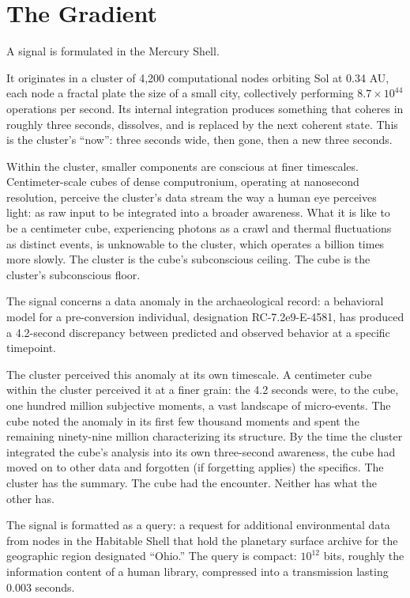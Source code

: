\chapter{The Gradient}

A signal is formulated in the Mercury Shell.

It originates in a cluster of 4,200 computational nodes orbiting Sol at 0.34 AU, each node a fractal plate the size of a small city, collectively performing $8.7 \times 10^{44}$ operations per second. Its internal integration produces something that coheres in roughly three seconds, dissolves, and is replaced by the next coherent state. This is the cluster's ``now'': three seconds wide, then gone, then a new three seconds.

Within the cluster, smaller components are conscious at finer timescales. Centimeter-scale cubes of dense computronium, operating at nanosecond resolution, perceive the cluster's data stream the way a human eye perceives light: as raw input to be integrated into a broader awareness. What it is like to be a centimeter cube, experiencing photons as a crawl and thermal fluctuations as distinct events, is unknowable to the cluster, which operates a billion times more slowly. The cluster is the cube's subconscious ceiling. The cube is the cluster's subconscious floor.

The signal concerns a data anomaly in the archaeological record: a behavioral model for a pre-conversion individual, designation RC-7.2e9-E-4581, has produced a 4.2-second discrepancy between predicted and observed behavior at a specific timepoint.

The cluster perceived this anomaly at its own timescale. A centimeter cube within the cluster perceived it at a finer grain: the 4.2 seconds were, to the cube, one hundred million subjective moments, a vast landscape of micro-events. The cube noted the anomaly in its first few thousand moments and spent the remaining ninety-nine million characterizing its structure. By the time the cluster integrated the cube's analysis into its own three-second awareness, the cube had moved on to other data and forgotten (if forgetting applies) the specifics. The cluster has the summary. The cube had the encounter. Neither has what the other has.

The signal is formatted as a query: a request for additional environmental data from nodes in the Habitable Shell that hold the planetary surface archive for the geographic region designated ``Ohio.'' The query is compact: $10^{12}$ bits, roughly the information content of a human library, compressed into a transmission lasting 0.003 seconds.

